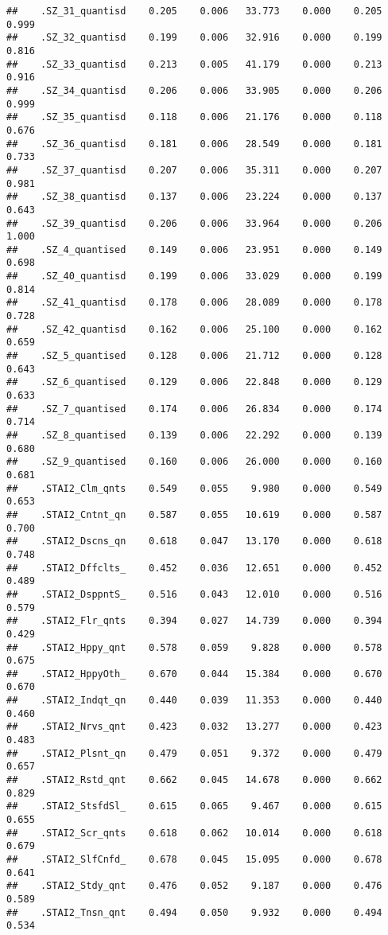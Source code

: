 \documentclass[]{article}
\begin{document}
\begin{verbatim}
##    .SZ_31_quantisd    0.205    0.006   33.773    0.000    0.205    0.999
##    .SZ_32_quantisd    0.199    0.006   32.916    0.000    0.199    0.816
##    .SZ_33_quantisd    0.213    0.005   41.179    0.000    0.213    0.916
##    .SZ_34_quantisd    0.206    0.006   33.905    0.000    0.206    0.999
##    .SZ_35_quantisd    0.118    0.006   21.176    0.000    0.118    0.676
##    .SZ_36_quantisd    0.181    0.006   28.549    0.000    0.181    0.733
##    .SZ_37_quantisd    0.207    0.006   35.311    0.000    0.207    0.981
##    .SZ_38_quantisd    0.137    0.006   23.224    0.000    0.137    0.643
##    .SZ_39_quantisd    0.206    0.006   33.964    0.000    0.206    1.000
##    .SZ_4_quantised    0.149    0.006   23.951    0.000    0.149    0.698
##    .SZ_40_quantisd    0.199    0.006   33.029    0.000    0.199    0.814
##    .SZ_41_quantisd    0.178    0.006   28.089    0.000    0.178    0.728
##    .SZ_42_quantisd    0.162    0.006   25.100    0.000    0.162    0.659
##    .SZ_5_quantised    0.128    0.006   21.712    0.000    0.128    0.643
##    .SZ_6_quantised    0.129    0.006   22.848    0.000    0.129    0.633
##    .SZ_7_quantised    0.174    0.006   26.834    0.000    0.174    0.714
##    .SZ_8_quantised    0.139    0.006   22.292    0.000    0.139    0.680
##    .SZ_9_quantised    0.160    0.006   26.000    0.000    0.160    0.681
##    .STAI2_Clm_qnts    0.549    0.055    9.980    0.000    0.549    0.653
##    .STAI2_Cntnt_qn    0.587    0.055   10.619    0.000    0.587    0.700
##    .STAI2_Dscns_qn    0.618    0.047   13.170    0.000    0.618    0.748
##    .STAI2_Dffclts_    0.452    0.036   12.651    0.000    0.452    0.489
##    .STAI2_DsppntS_    0.516    0.043   12.010    0.000    0.516    0.579
##    .STAI2_Flr_qnts    0.394    0.027   14.739    0.000    0.394    0.429
##    .STAI2_Hppy_qnt    0.578    0.059    9.828    0.000    0.578    0.675
##    .STAI2_HppyOth_    0.670    0.044   15.384    0.000    0.670    0.670
##    .STAI2_Indqt_qn    0.440    0.039   11.353    0.000    0.440    0.460
##    .STAI2_Nrvs_qnt    0.423    0.032   13.277    0.000    0.423    0.483
##    .STAI2_Plsnt_qn    0.479    0.051    9.372    0.000    0.479    0.657
##    .STAI2_Rstd_qnt    0.662    0.045   14.678    0.000    0.662    0.829
##    .STAI2_StsfdSl_    0.615    0.065    9.467    0.000    0.615    0.655
##    .STAI2_Scr_qnts    0.618    0.062   10.014    0.000    0.618    0.679
##    .STAI2_SlfCnfd_    0.678    0.045   15.095    0.000    0.678    0.641
##    .STAI2_Stdy_qnt    0.476    0.052    9.187    0.000    0.476    0.589
##    .STAI2_Tnsn_qnt    0.494    0.050    9.932    0.000    0.494    0.534

\end{verbatim}
\end{document}
